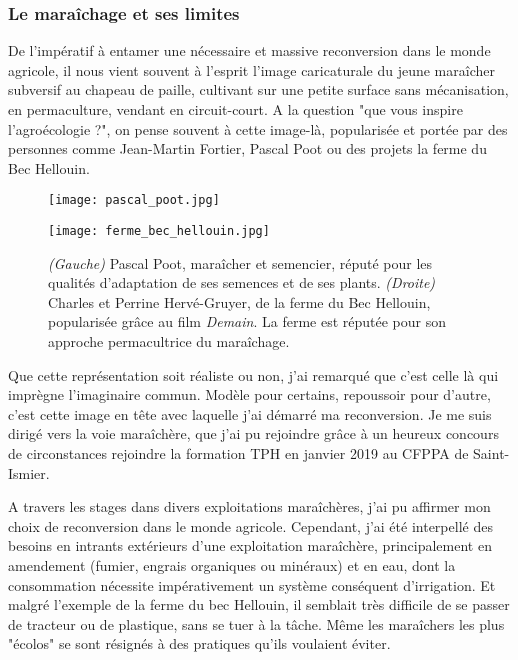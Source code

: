 \documentclass{book}
\begin{document}
\subsubsection{Le maraîchage et ses limites}

De l'impératif à entamer une nécessaire et massive reconversion dans le monde agricole, il nous vient souvent à l'esprit l'image caricaturale du jeune maraîcher subversif au chapeau de paille, cultivant sur une petite surface sans mécanisation, en permaculture, vendant en circuit-court. A la question "que vous inspire l'agroécologie ?", on pense souvent à cette image-là, popularisée et portée par des personnes comme Jean-Martin Fortier, Pascal Poot ou des projets la ferme du Bec Hellouin. 

\begin{figure}[h!]
\centering
\begin{minipage}{.5\textwidth}
  \centering
  \texttt{[image: pascal\_poot.jpg]}
  \label{fig:test1}
\end{minipage}%
\begin{minipage}{.5\textwidth}
  \centering
  \texttt{[image: ferme\_bec\_hellouin.jpg]}
  \label{fig:test2}
\end{minipage}
\caption{\textit{(Gauche)} Pascal Poot, maraîcher et semencier, réputé pour les qualités d'adaptation de ses semences et de ses plants. \textit{(Droite)} Charles et Perrine Hervé-Gruyer, de la ferme du Bec Hellouin, popularisée grâce au film \textit{Demain}. La ferme est réputée pour son approche permacultrice du maraîchage.}
\label{fig:test}
\end{figure}

Que cette représentation soit réaliste ou non, j'ai remarqué que c'est celle là qui imprègne l'imaginaire commun. Modèle pour certains, repoussoir pour d'autre, c'est  cette image en tête avec laquelle j'ai démarré ma reconversion. Je me suis dirigé vers la voie maraîchère, que j'ai pu rejoindre grâce à un heureux concours de circonstances rejoindre la formation TPH en janvier 2019 au CFPPA de Saint-Ismier. 

A travers les stages dans divers exploitations maraîchères, j'ai pu affirmer mon choix de reconversion dans le monde agricole. Cependant, j'ai été interpellé des besoins en intrants extérieurs d'une exploitation maraîchère, principalement en amendement (fumier, engrais organiques ou minéraux) et en eau, dont la consommation nécessite impérativement un système conséquent d'irrigation. Et malgré l'exemple de la ferme du bec Hellouin, il semblait très difficile de se passer de tracteur ou de plastique, sans se tuer à la tâche. Même les maraîchers les plus "écolos" se sont résignés à des pratiques qu'ils voulaient éviter.
\end{document}

